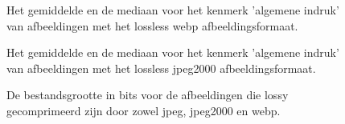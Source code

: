 \FloatBarrier
\begin{figure}[h!]
	\centering
	\caption{Het gemiddelde en de mediaan voor het kenmerk 'algemene indruk' van afbeeldingen met het \gls{lossless} \gls{webp} afbeeldingsformaat.}
	\label{fig:bijlages-onderzoek-resultaten-lossless-webp-gem-med}
\end{figure}
\FloatBarrier

\FloatBarrier
\begin{figure}[h!]
	\centering
	\caption{Het gemiddelde en de mediaan voor het kenmerk 'algemene indruk' van afbeeldingen met het \gls{lossless} \gls{jpeg2000} afbeeldingsformaat.}
	\label{fig:bijlages-onderzoek-resultaten-lossless-jpeg2000-gem-med}
\end{figure}
\FloatBarrier

\FloatBarrier
\begin{figure}[h!]
	\centering
	\caption{De bestandsgrootte in \glspl{bit} voor de afbeeldingen die \gls{lossy} gecomprimeerd zijn door zowel \gls{jpeg}, \gls{jpeg2000} en \gls{webp}.}
	\label{fig:onderzoek-resultaten-lossy-sizes}
\end{figure}
\FloatBarrier

